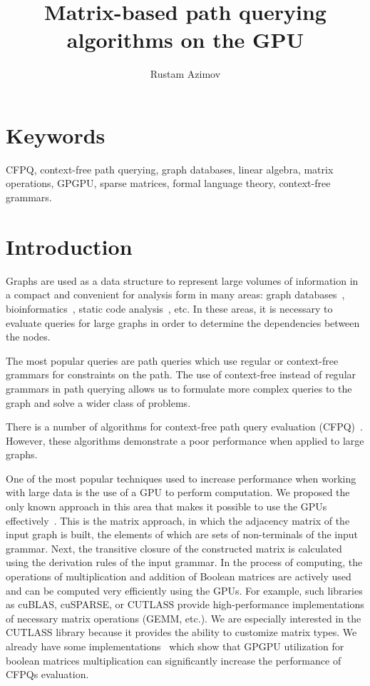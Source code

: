 \documentclass[12pt]{article}  %
\title{Matrix-based path querying algorithms on the GPU}
\author{Rustam Azimov}
\date{}
\theoremstyle{remark}
\begin{document}

\maketitle

\section*{Keywords}
CFPQ, context-free path querying, graph databases, linear algebra, matrix operations, GPGPU, sparse matrices, formal language theory, context-free grammars.

\section{Introduction}
Graphs are used as a data structure to represent large volumes of information in a compact and convenient for analysis form in many areas: graph databases~\cite{redis,graphDB, kuijpers2019experimental}, bioinformatics~\cite{have2013graph, GraphQueryWithEarley}, static code analysis~\cite{kodumal2004set, zhang2013fast}, etc. In these areas, it is necessary to evaluate queries for large graphs in order to determine the dependencies between the nodes. 

The most popular queries are path queries which use regular or context-free grammars for constraints on the path. The use of context-free instead of regular grammars in path querying allows us to formulate more complex queries to the graph and solve a wider class of problems.

There is a number of algorithms for context-free path query evaluation (CFPQ)~\cite{GraphQueryWithEarley, GLL, hellingsRelational, RDF}. However, these algorithms demonstrate a poor performance when applied to large graphs.

One of the most popular techniques used to increase performance when working with large data is the use of a GPU to perform computation. We proposed the only known approach in this area that makes it possible to use the GPUs effectively~\cite{azimov2018context}. This is the matrix approach, in which the adjacency matrix of the input graph is built, the elements of which are sets of non-terminals of the input grammar. Next, the transitive closure of the constructed matrix is calculated using the derivation rules of the input grammar. In the process of computing, the operations of multiplication and addition of Boolean matrices are actively used and can be computed very efficiently using the GPUs. For example, such libraries as cuBLAS, cuSPARSE, or CUTLASS provide high-performance implementations of necessary matrix operations (GEMM, etc.). We are especially interested in the CUTLASS library because it provides the ability to customize matrix types. We already have some implementations~\cite{mishin2019evaluation} which show that GPGPU utilization for boolean matrices multiplication can significantly increase the performance of CFPQs evaluation.
\end{document}
